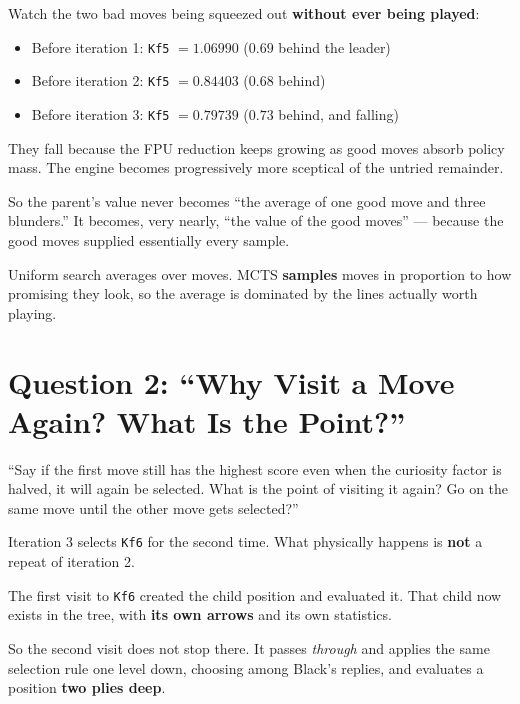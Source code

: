 Watch the two bad moves being squeezed out \textbf{without ever being played}:
\begin{itemize}[leftmargin=2em]
  \item Before iteration 1: \texttt{Kf5} $= 1.06990$ ($0.69$ behind the leader)
  \item Before iteration 2: \texttt{Kf5} $= 0.84403$ ($0.68$ behind)
  \item Before iteration 3: \texttt{Kf5} $= 0.79739$ ($0.73$ behind, and falling)
\end{itemize}
They fall because the FPU reduction keeps growing as good moves absorb policy mass. The engine becomes progressively more sceptical of the untried remainder.

So the parent's value never becomes ``the average of one good move and three blunders.'' It becomes, very nearly, ``the value of the good moves'' --- because the good moves supplied essentially every sample.

\begin{keyidea}[title={The Single Most Important Idea in MCTS}]
Uniform search averages over moves. MCTS \textbf{samples} moves in proportion to how promising they look, so the average is dominated by the lines actually worth playing.
\end{keyidea}

\section{Question 2: ``Why Visit a Move Again? What Is the Point?''}

\begin{studentq}
``Say if the first move still has the highest score even when the curiosity factor is halved, it will again be selected. What is the point of visiting it again? Go on the same move until the other move gets selected?''
\end{studentq}

Iteration 3 selects \texttt{Kf6} for the second time. What physically happens is \textbf{not} a repeat of iteration 2.

The first visit to \texttt{Kf6} created the child position and evaluated it. That child now exists in the tree, with \textbf{its own arrows} and its own statistics.

So the second visit does not stop there. It passes \textit{through} and applies the same selection rule one level down, choosing among Black's replies, and evaluates a position \textbf{two plies deep}.

